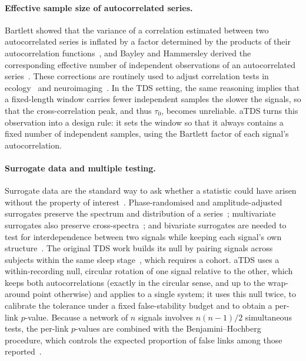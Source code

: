 \documentclass[11pt,a4paper]{article}
\begin{document}
\paragraph{Effective sample size of autocorrelated series.}
Bartlett showed that the variance of a correlation estimated between two autocorrelated series is inflated by a factor determined by the products of their autocorrelation functions~\cite{Bartlett1946TheoreticalSpecification}, and Bayley and Hammersley derived the corresponding effective number of independent observations of an autocorrelated series~\cite{Bayley1946EffectiveNumber}. These corrections are routinely used to adjust correlation tests in ecology~\cite{Pyper1998ComparisonMethods} and neuroimaging~\cite{Afyouni2019EffectiveDegrees}. In the TDS setting, the same reasoning implies that a fixed-length window carries fewer independent samples the slower the signals, so that the cross-correlation peak, and thus $\tau_0$, becomes unreliable. aTDS turns this observation into a design rule: it sets the window so that it always contains a fixed number of independent samples, using the Bartlett factor of each signal's autocorrelation.

\paragraph{Surrogate data and multiple testing.}
Surrogate data are the standard way to ask whether a statistic could have arisen without the property of interest~\cite{Theiler1992TestingNonlinearity,Schreiber2000SurrogateTime,Lancaster2018SurrogateData}. Phase-randomised and amplitude-adjusted surrogates preserve the spectrum and distribution of a series~\cite{Theiler1992TestingNonlinearity,Schreiber1996ImprovedSurrogate}; multivariate surrogates also preserve cross-spectra~\cite{Prichard1994GeneratingSurrogate}; and bivariate surrogates are needed to test for interdependence between two signals while keeping each signal's own structure~\cite{Andrzejak2003BivariateSurrogate}. The original TDS work builds its null by pairing signals across subjects within the same sleep stage~\cite{Bashan2012NetworkPhysiology}, which requires a cohort. aTDS uses a within-recording null, circular rotation of one signal relative to the other, which keeps both autocorrelations (exactly in the circular sense, and up to the wrap-around point otherwise) and applies to a single system; it uses this null twice, to calibrate the tolerance under a fixed false-stability budget and to obtain a per-link $p$-value. Because a network of $n$ signals involves $n(n-1)/2$ simultaneous tests, the per-link $p$-values are combined with the Benjamini--Hochberg procedure, which controls the expected proportion of false links among those reported~\cite{Benjamini1995ControllingFalse}.
\end{document}
